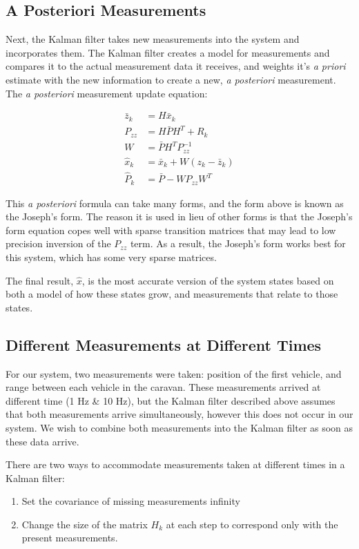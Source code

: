 \documentclass[12pt,onecolumn,reqno]{amsart}
\begin{document}
\subsection{A Posteriori Measurements}
Next, the Kalman filter takes new measurements into the system and incorporates
them. The Kalman filter creates a model for measurements and compares it to the
actual measurement data it receives, and weights it's \textit{a priori} estimate
with the new information to create a new, \textit{a posteriori} measurement. The
\textit{a posteriori} measurement update equation:

\begin{align*}
  \bar{z}_{k} &= H \bar{x}_{k} \\
  P_{zz} &=  H \bar{P} H^{T} + R_{k} \\
  W &= \bar{P} H^{T} P_{zz}^{-1} \\
  \hat{x}_{k} &= \bar{x}_{k} + W (z_{k} - \bar{z}_{k}) \\
  \hat{P}_{k} &= \bar{P} - W P_{zz} W^{T}
\end{align*}

This \textit{a posteriori} formula can take many forms, and the form above is known as the
Joseph's form. The reason it is used in lieu of other forms is that the Joseph's
form equation copes well with sparse transition matrices that may lead to low
precision inversion of the $P_{zz}$ term. As a result, the Joseph's form works
best for this system, which has some very sparse matrices.

The final result, $\hat{x}$, is the most accurate version of the system states
based on both a model of how these states grow, and measurements that relate to
those states.

\subsection{Different Measurements at Different Times}
For our system, two measurements were taken: position of the first vehicle, and
range between each vehicle in the caravan. These measurements arrived at
different time (1 Hz \& 10 Hz), but the Kalman filter described above assumes
that both measurements arrive simultaneously, however this does not occur in our
system. We wish to combine both measurements into the Kalman filter as soon as
these data arrive.

There are two ways to accommodate measurements taken at different times in a
Kalman filter: 
\begin{enumerate}
  \item Set the covariance of missing measurements infinity
  \item Change the size of the matrix $H_k$ at each step to correspond only with
    the present measurements.
\end{enumerate}
\end{document}
